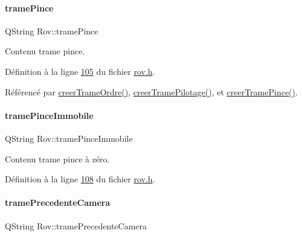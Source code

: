 \paragraph{\texorpdfstring{trame\+Pince}{tramePince}}
{\footnotesize\ttfamily Q\+String Rov\+::trame\+Pince\hspace{0.3cm}{\ttfamily [private]}}



Contenu trame pince. 



Définition à la ligne \hyperlink{rov_8h_source_l00105}{105} du fichier \hyperlink{rov_8h_source}{rov.\+h}.



Référencé par \hyperlink{rov_8cpp_source_l00230}{creer\+Trame\+Ordre()}, \hyperlink{rov_8cpp_source_l00219}{creer\+Trame\+Pilotage()}, et \hyperlink{rov_8cpp_source_l00240}{creer\+Trame\+Pince()}.

\mbox{\label{class_rov_a30595a8bd60324832b6a6eb5b542d211}} 
\paragraph{\texorpdfstring{trame\+Pince\+Immobile}{tramePinceImmobile}}
{\footnotesize\ttfamily Q\+String Rov\+::trame\+Pince\+Immobile\hspace{0.3cm}{\ttfamily [private]}}



Contenu trame pince à zéro. 



Définition à la ligne \hyperlink{rov_8h_source_l00108}{108} du fichier \hyperlink{rov_8h_source}{rov.\+h}.

\mbox{\label{class_rov_a66e64595d9bb97dfbfa6f2ed9548b216}} 
\paragraph{\texorpdfstring{trame\+Precedente\+Camera}{tramePrecedenteCamera}}
{\footnotesize\ttfamily Q\+String Rov\+::trame\+Precedente\+Camera\hspace{0.3cm}{\ttfamily [private]}}



